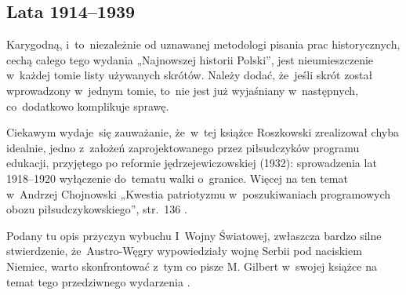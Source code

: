 \documentclass[a4paper,11pt]{article}
\begin{document}
\vspace{\spaceTwo}










\subsection{Lata 1914--1939}

\vspace{\spaceThree}







\start Karygodną, i~to~niezależnie od uznawanej metodologi pisania
prac historycznych, cechą całego tego wydania „Najnowszej historii
Polski”, jest nieumieszczenie w~każdej tomie listy używanych
skrótów. Należy dodać, że~jeśli skrót został wprowadzony w~jednym
tomie, to~nie jest już wyjaśniany w~następnych, co~dodatkowo
komplikuje sprawę.

\vspace{\spaceFour}



\start Ciekawym wydaje~się zauważanie, że~w~tej książce Roszkowski
zrealizował chyba idealnie, jedno z~założeń zaprojektowanego przez
piłsudczyków programu edukacji, przyjętego po reformie
jędrzejewiczowskiej (1932): sprowadzenia lat 1918--1920 wyłączenie
do~tematu walki o~granice. Więcej na ten temat \\
w~Andrzej Chojnowski „Kwestia patriotyzmu w~poszukiwaniach
programowych obozu piłsudczykowskiego”, str.~136
\cite{RedKloczkowskiPatriotyzmPolakow2006}.

\vspace{\spaceFour}



\start {} Podany tu opis przyczyn wybuchu I~Wojny Światowej,
zwłaszcza bardzo silne stwierdzenie, że~Austro-Węgry
wypowiedziały wojnę Serbii pod naciskiem Niemiec, warto skonfrontować
z~tym co pisze M. Gilbert w~swojej książce na temat tego przedziwnego
wydarzenia \cite{GilbertPierwszaWojnaSwiatowa2003}.
\end{document}
